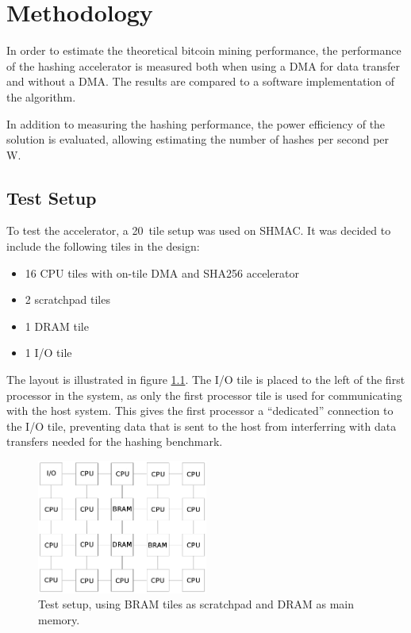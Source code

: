 \chapter{Methodology}
\label{cha:methodology}

In order to estimate the theoretical bitcoin mining performance, the performance
of the hashing accelerator is measured both when using a DMA for data transfer
and without a DMA. The results are compared to a software implementation of the
algorithm.

In addition to measuring the hashing performance, the power efficiency of the
solution is evaluated, allowing estimating the number of hashes per second per W.

\section{Test Setup}
\label{sec:SHMAC_setup}

To test the accelerator, a 20~tile setup was used on SHMAC. It was decided to include
the following tiles in the design:

\begin{itemize}
    \item 16 CPU tiles with on-tile DMA and SHA256 accelerator
    \item 2 scratchpad tiles
    \item 1 DRAM tile
    \item 1 I/O tile
\end{itemize}

The layout is illustrated in figure \ref{fig:5x4}. The I/O tile is placed to the
left of the first processor in the system, as only the first processor tile is used
for communicating with the host system. This gives the first processor a ``dedicated''
connection to the I/O tile, preventing data that is sent to the host from interferring
with data transfers needed for the hashing benchmark.

\begin{figure}[htb]
    \centering
    \includegraphics[width=0.5\textwidth]{Figures/Measurements/5x4}
    \caption{Test setup, using BRAM tiles as scratchpad and DRAM as main memory.}
    \label{fig:5x4}
\end{figure}

